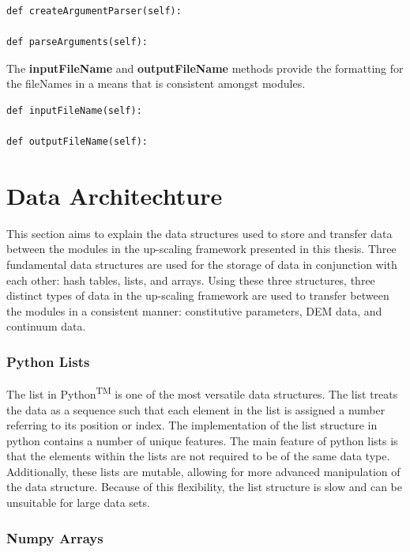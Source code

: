 \begin{lstlisting}[frame=single]    
def createArgumentParser(self):
    
def parseArguments(self):
\end{lstlisting}

The \textbf{inputFileName} and \textbf{outputFileName} methods provide the formatting for the fileNames in a means that is consistent amongst modules.

\begin{lstlisting}[frame=single]
def inputFileName(self):
        
def outputFileName(self):
\end{lstlisting}

\section{Data Architechture}

This section aims to explain the data structures used to store and transfer data between the modules in the up-scaling framework presented in this thesis.  Three fundamental data structures are used for the storage of data in conjunction with each other: hash tables, lists, and arrays. Using these three structures, three distinct types of data in the up-scaling framework are used to transfer between the modules in a consistent manner: constitutive parameters, DEM data, and continuum data.

\subsubsection*{Python Lists}

The list in Python\textsuperscript{TM} is one of the most versatile data structures. The list treats the data as a sequence such that each element in the list is assigned a number referring to its position or index.  The implementation of the list structure in python contains a number of unique features. The main feature of python lists is that the elements within the lists are not required to be of the same data type. Additionally, these lists are mutable, allowing for more advanced manipulation of the data structure. Because of this flexibility, the list structure is slow and can be unsuitable for large data sets. 

\subsubsection*{Numpy Arrays}

